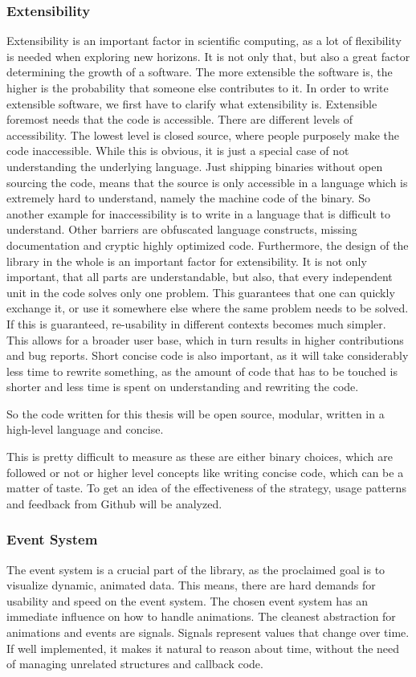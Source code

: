 \subsubsection{Extensibility}
Extensibility is an important factor in scientific computing, as a lot of flexibility is needed when exploring new horizons. 
It is not only that, but also a great factor determining the growth of a software. The more extensible the software is, the higher is the probability that someone else contributes to it.
In order to write extensible software, we first have to clarify what extensibility is.
Extensible foremost needs that the code is accessible. There are different levels of accessibility. The lowest level is closed source, where people purposely make the code inaccessible. While this is obvious, it is just a special case of not understanding the underlying language. Just shipping binaries without open sourcing the code, means that the source is only accessible in a language which is extremely hard to understand, namely the machine code of the binary. So another example for inaccessibility is to write in a language that is difficult to understand. Other barriers are obfuscated language constructs, missing documentation and cryptic highly optimized code.
Furthermore, the design of the library in the whole is an important factor for extensibility. It is not only important, that all parts are understandable, but also, that every independent unit in the code solves only one problem. This guarantees that one can quickly exchange it, or use it somewhere else where the same problem needs to be solved.
If this is guaranteed, re-usability in different contexts becomes much simpler. This allows for a broader user base, which in turn results in higher contributions and bug reports.
Short concise code is also important, as it will take considerably less time to rewrite something, as the amount of code that has to be touched is shorter and less time is spent on understanding and rewriting the code.

So the code written for this thesis will be open source, modular, written in a high-level language and concise.

This is pretty difficult to measure as these are either binary choices, which are followed or not or higher level concepts like writing concise code, which can be a matter of taste.
To get an idea of the effectiveness of the strategy, usage patterns and feedback from Github will be analyzed.

\subsubsection{Event System}
The event system is a crucial part of the library, as the proclaimed goal is to visualize dynamic, animated data.
This means, there are hard demands for usability and speed on the event system.
The chosen event system has an immediate influence on how to handle animations. 
The cleanest abstraction for animations and events are signals. Signals represent values that change over time.
If well implemented, it makes it natural to reason about time, without the need of managing unrelated structures and callback code.

